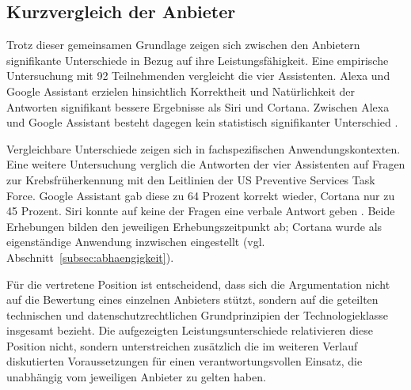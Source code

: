 \subsection{Kurzvergleich der Anbieter}
Trotz dieser gemeinsamen Grundlage zeigen sich zwischen den Anbietern signifikante Unterschiede in Bezug auf ihre Leistungsfähigkeit. Eine empirische Untersuchung mit 92 Teilnehmenden vergleicht die vier Assistenten. Alexa und Google Assistant erzielen hinsichtlich Korrektheit und Natürlichkeit der Antworten signifikant bessere Ergebnisse als Siri und Cortana. Zwischen Alexa und Google Assistant besteht dagegen kein statistisch signifikanter Unterschied \cite{Berdasco2019}.

Vergleichbare Unterschiede zeigen sich in fachspezifischen Anwendungskontexten.
Eine weitere Untersuchung verglich die Antworten der vier Assistenten auf Fragen zur Krebsfrüherkennung mit den Leitlinien der US Preventive Services Task Force. Google Assistant gab diese zu 64 Prozent korrekt wieder, Cortana nur zu 45 Prozent. Siri konnte auf keine der Fragen eine verbale Antwort geben \cite{Hong2021}. Beide Erhebungen bilden den jeweiligen Erhebungszeitpunkt ab; Cortana wurde als eigenständige Anwendung inzwischen eingestellt (vgl. Abschnitt~\ref{subsec:abhaengigkeit}).

Für die vertretene Position ist entscheidend, dass sich die Argumentation nicht auf die Bewertung eines einzelnen Anbieters stützt, sondern auf die geteilten technischen und datenschutzrechtlichen Grundprinzipien der Technologieklasse insgesamt bezieht. Die aufgezeigten Leistungsunterschiede relativieren diese Position nicht, sondern unterstreichen zusätzlich die im weiteren Verlauf diskutierten Voraussetzungen für einen verantwortungsvollen Einsatz, die unabhängig vom jeweiligen Anbieter zu gelten haben.